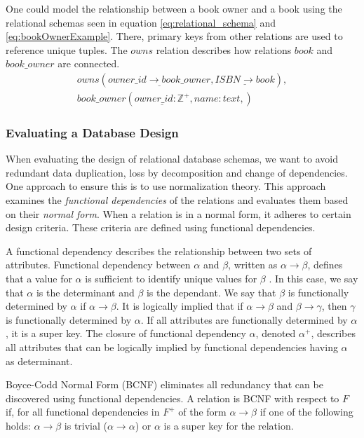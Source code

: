 One could model the relationship between a book owner and a book using the relational schemas seen in equation \ref{eq:relational_schema} and \ref{eq:bookOwnerExample}.
There, primary keys from other relations are used to reference unique tuples. The $owns$ relation describes how relations $book$ and $book\_owner$ are connected. 
\begin{equation}\label{eq:bookOwnerExample}
    \begin{split}
        owns(\underline{owner\_id \rightarrow book\_owner}, \underline{ISBN \rightarrow book}), \\
        book\_owner(\underline{owner\_id:\mathbb{Z}^+}, name:text,)
    \end{split}
\end{equation}

\subsubsection*{Evaluating a Database Design}
When evaluating the design of relational database schemas, we want to avoid redundant data duplication, loss by decomposition and change of dependencies\cite{DBSBook}.
One approach to ensure this is to use normalization theory\cite{DBSBook}. 
This approach examines the \textit{functional dependencies} of the relations and evaluates them based on their \textit{normal form}.
When a relation is in a normal form, it adheres to certain design criteria. 
These criteria are defined using functional dependencies.

A functional dependency describes the relationship between two sets of attributes. 
Functional dependency between $\alpha$ and $\beta$, written as $\alpha \rightarrow \beta$, defines that a value for $\alpha$ is sufficient to identify unique values for $\beta$ \cite{DBSBook}.
In this case, we say that $\alpha$ is the determinant and $\beta$ is the dependant. 
We say that $\beta$ is functionally determined by $\alpha$ if $\alpha \rightarrow \beta$.
It is logically implied that if $\alpha \rightarrow \beta$ and $\beta \rightarrow \gamma$, then $\gamma$ is functionally determined by $\alpha$.
If all attributes are functionally determined by $\alpha$, it is a super key\cite{DBSBook}.
The closure of functional dependency $\alpha$, denoted $\alpha^+$, describes all attributes that can be logically implied by functional dependencies having $\alpha$ as determinant\cite{DBSBook}. 

Boyce-Codd Normal Form (BCNF) eliminates all redundancy that can be discovered using functional dependencies\cite{DBSBook}. 
A relation is BCNF with respect to $F$ if, for all functional dependencies in $F^+$ of the form $\alpha \rightarrow \beta$ if one of the following holds:
$\alpha \rightarrow \beta$ is trivial ($\alpha \rightarrow \alpha$) or $\alpha$ is a super key for the relation.

